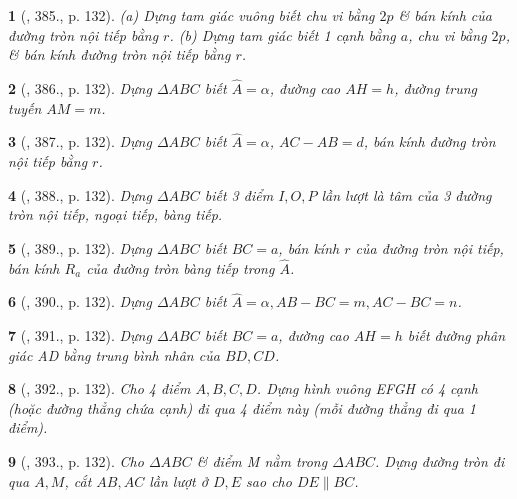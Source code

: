 \documentclass{article}
\newtheorem{baitoan}{}
\begin{document}
\begin{baitoan}[\cite{Binh_Toan_9_tap_2}, 385., p. 132]
	(a) Dựng tam giác vuông biết chu vi bằng $2p$ \& bán kính của đường tròn nội tiếp bằng $r$. (b) Dựng tam giác biết 1 cạnh bằng $a$, chu vi bằng $2p$, \& bán kính đường tròn nội tiếp bằng $r$.
\end{baitoan}

\begin{baitoan}[\cite{Binh_Toan_9_tap_2}, 386., p. 132]
	Dựng $\Delta ABC$ biết $\widehat{A} = \alpha$, đường cao $AH = h$, đường trung tuyến $AM = m$.
\end{baitoan}

\begin{baitoan}[\cite{Binh_Toan_9_tap_2}, 387., p. 132]
	Dựng $\Delta ABC$ biết $\widehat{A} = \alpha$, $AC - AB = d$, bán kính đường tròn nội tiếp bằng $r$.
\end{baitoan}

\begin{baitoan}[\cite{Binh_Toan_9_tap_2}, 388., p. 132]
	Dựng $\Delta ABC$ biết 3 điểm $I,O,P$ lần lượt là tâm của 3 đường tròn nội tiếp, ngoại tiếp, bàng tiếp.
\end{baitoan}

\begin{baitoan}[\cite{Binh_Toan_9_tap_2}, 389., p. 132]
	Dựng $\Delta ABC$ biết $BC = a$, bán kính $r$ của đường tròn nội tiếp, bán kính $R_a$ của đường tròn bàng tiếp trong $\widehat{A}$.
\end{baitoan}

\begin{baitoan}[\cite{Binh_Toan_9_tap_2}, 390., p. 132]
	Dựng $\Delta ABC$ biết $\widehat{A} = \alpha,AB - BC = m,AC - BC = n$.
\end{baitoan}

\begin{baitoan}[\cite{Binh_Toan_9_tap_2}, 391., p. 132]
	Dựng $\Delta ABC$ biết $BC = a$, đường cao $AH = h$ biết đường phân giác AD bằng trung bình nhân của $BD,CD$.
\end{baitoan}

\begin{baitoan}[\cite{Binh_Toan_9_tap_2}, 392., p. 132]
	Cho 4 điểm $A,B,C,D$. Dựng hình vuông EFGH có 4 cạnh (hoặc đường thẳng chứa cạnh) đi qua 4 điểm này (mỗi đường thẳng đi qua 1 điểm).
\end{baitoan}

\begin{baitoan}[\cite{Binh_Toan_9_tap_2}, 393., p. 132]
	Cho $\Delta ABC$ \& điểm M nằm trong $\Delta ABC$. Dựng đường tròn đi qua $A,M$, cắt $AB,AC$ lần lượt ở $D,E$ sao cho $DE\parallel BC$.
\end{baitoan}
\end{document}
